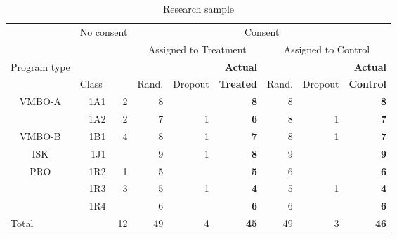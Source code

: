   \begin{table}[htbp]
  \centering
  \caption{Research sample}
    \begin{tabular}{p{0.5cm}rrrrrrrr}
    \toprule
          &       \multicolumn{2}{r}{No consent} & \multicolumn{6}{c}{Consent} \\ \cmidrule(r){3-3} \cmidrule(r){4-9} 
          &       &       & \multicolumn{3}{c}{Assigned to Treatment} & \multicolumn{3}{c}{Assigned to Control} \\
\cmidrule(r){4-6} \cmidrule(r){7-9}    \multicolumn{1}{c}{\multirow{2}[2]{*}{Program type}} &       &       &       &       & \textbf{Actual} &       &       & \textbf{Actual} \\
          & \multicolumn{1}{l}{Class} &       & \multicolumn{1}{l}{Rand.} & \multicolumn{1}{l}{Dropout} & \textbf{Treated} & \multicolumn{1}{l}{Rand.} & \multicolumn{1}{l}{Dropout} & \textbf{Control} \\
    \midrule
    \multicolumn{1}{c}{\multirow{2}[1]{*}{VMBO-A}} & 1A1   & 2     & 8     &       & \textbf{8} & 8     &       & \textbf{8} \\
          & 1A2   & 2     & 7     & 1     & \textbf{6} & 8     & 1     & \textbf{7} \\  \midrule
    \multicolumn{1}{c}{VMBO-B} & 1B1   & 4     & 8     & 1     & \textbf{7} & 8     & 1     & \textbf{7} \\   \midrule
    \multicolumn{1}{c}{ISK} & 1J1   &       & 9     & 1     & \textbf{8} & 9     &       & \textbf{9} \\   \midrule
    \multicolumn{1}{c}{\multirow{3}[1]{*}{PRO}} & 1R2   & 1     & 5     &       & \textbf{5} & 6     &       & \textbf{6} \\
          & 1R3   & 3     & 5     & 1     & \textbf{4} & 5     & 1     & \textbf{4} \\
          & 1R4   &       & 6     &       & \textbf{6} & 6     &       & \textbf{6} \\
    \midrule
    Total &       & 12    & 49    & 4     & \textbf{45} & 49    & 3     & \textbf{46} \\
    \bottomrule
    \end{tabular}%
  \label{tab:sample}%
\end{table}%